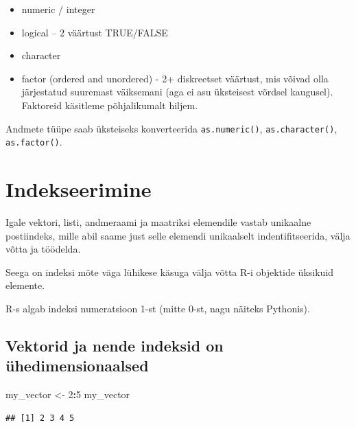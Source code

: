 \documentclass[]{book}
\newenvironment{Shaded}{\begin{snugshade}}{\end{snugshade}}
\newcommand{\DecValTok}[1]{\textcolor[rgb]{0.00,0.00,0.81}{#1}}
\newcommand{\StringTok}[1]{\textcolor[rgb]{0.31,0.60,0.02}{#1}}
\newcommand{\CommentTok}[1]{\textcolor[rgb]{0.56,0.35,0.01}{\textit{#1}}}
\newcommand{\OperatorTok}[1]{\textcolor[rgb]{0.81,0.36,0.00}{\textbf{#1}}}
\newcommand{\NormalTok}[1]{#1}
\providecommand{\tightlist}{%
  \setlength{\itemsep}{0pt}\setlength{\parskip}{0pt}}
\begin{document}
\begin{itemize}
\tightlist
\item
  numeric / integer
\item
  logical -- 2 väärtust TRUE/FALSE
\item
  character
\item
  factor (ordered and unordered) - 2+ diskreetset väärtust, mis võivad
  olla järjestatud suuremast väiksemani (aga ei asu üksteisest võrdsel
  kaugusel). Faktoreid käsitleme põhjalikumalt hiljem.
\end{itemize}

Andmete tüüpe saab üksteiseks konverteerida \texttt{as.numeric()},
\texttt{as.character()}, \texttt{as.factor()}.

\section{Indekseerimine}\label{indekseerimine}

Igale vektori, listi, andmeraami ja maatriksi elemendile vastab
unikaalne postiindeks, mille abil saame just selle elemendi unikaalselt
indentifitseerida, välja võtta ja töödelda.

Seega on indeksi mõte väga lühikese käsuga välja võtta R-i objektide
üksikuid elemente.

R-s algab indeksi numeratsioon 1-st (mitte 0-st, nagu näiteks Pythonis).

\subsection{Vektorid ja nende indeksid on
ühedimensionaalsed}\label{vektorid-ja-nende-indeksid-on-uhedimensionaalsed}

\begin{Shaded}
\begin{Highlighting}[]
\NormalTok{my_vector <-}\StringTok{ }\DecValTok{2}\OperatorTok{:}\DecValTok{5} 
\NormalTok{my_vector}
\end{Highlighting}
\end{Shaded}

\begin{verbatim}
## [1] 2 3 4 5
\end{verbatim}

\begin{Shaded}
\end{Shaded}
\end{document}

